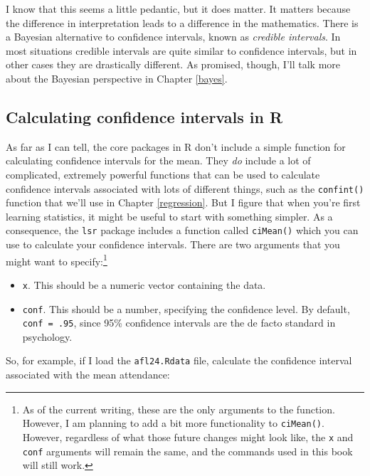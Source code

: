 \documentclass[
]{book}
\providecommand{\tightlist}{%
  \setlength{\itemsep}{0pt}\setlength{\parskip}{0pt}}
\begin{document}
I know that this seems a little pedantic, but it does matter. It matters because the difference in interpretation leads to a difference in the mathematics. There is a Bayesian alternative to confidence intervals, known as \emph{credible intervals}. In most situations credible intervals are quite similar to confidence intervals, but in other cases they are drastically different. As promised, though, I'll talk more about the Bayesian perspective in Chapter \ref{bayes}.

\hypertarget{calculating-confidence-intervals-in-r}{%
\subsection{Calculating confidence intervals in R}\label{calculating-confidence-intervals-in-r}}

As far as I can tell, the core packages in R don't include a simple function for calculating confidence intervals for the mean. They \emph{do} include a lot of complicated, extremely powerful functions that can be used to calculate confidence intervals associated with lots of different things, such as the \texttt{confint()} function that we'll use in Chapter \ref{regression}. But I figure that when you're first learning statistics, it might be useful to start with something simpler. As a consequence, the \texttt{lsr} package includes a function called \texttt{ciMean()} which you can use to calculate your confidence intervals. There are two arguments that you might want to specify:\footnote{As of the current writing, these are the only arguments to the function. However, I am planning to add a bit more functionality to \texttt{ciMean()}. However, regardless of what those future changes might look like, the \texttt{x} and \texttt{conf} arguments will remain the same, and the commands used in this book will still work.}

\begin{itemize}
\tightlist
\item
  \texttt{x}. This should be a numeric vector containing the data.
\item
  \texttt{conf}. This should be a number, specifying the confidence level. By default, \texttt{conf\ =\ .95}, since 95\% confidence intervals are the de facto standard in psychology.
\end{itemize}

So, for example, if I load the \texttt{afl24.Rdata} file, calculate the confidence interval associated with the mean attendance:
\end{document}
